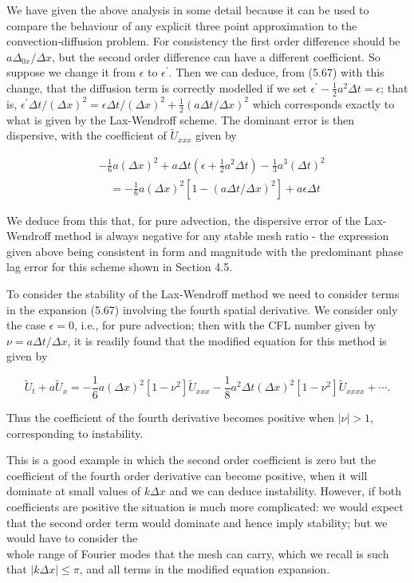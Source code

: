 \documentclass[10pt]{article}
\begin{document}
We have given the above analysis in some detail because it can be used to compare the behaviour of any explicit three point approximation to the convection-diffusion problem. For consistency the first order difference should be \(a \Delta_{0 x} / \Delta x\), but the second order difference can have a different coefficient. So suppose we change it from \(\epsilon\) to \(\epsilon^{\prime}\). Then we can deduce, from (5.67) with this change, that the diffusion term is correctly modelled if we set \(\epsilon^{\prime}-\frac{1}{2} a^{2} \Delta t=\epsilon\); that is, \(\epsilon^{\prime} \Delta t /(\Delta x)^{2}=\epsilon \Delta t /(\Delta x)^{2}+\frac{1}{2}(a \Delta t / \Delta x)^{2}\) which corresponds exactly to what is given by the Lax-Wendroff scheme. The dominant error is then dispersive, with the coefficient of \(\tilde{U}_{x x x}\) given by

\[
\begin{aligned}
& -\frac{1}{6} a(\Delta x)^{2}+a \Delta t\left(\epsilon+\frac{1}{2} a^{2} \Delta t\right)-\frac{1}{3} a^{3}(\Delta t)^{2} \\
& \quad=-\frac{1}{6} a(\Delta x)^{2}\left[1-(a \Delta t / \Delta x)^{2}\right]+a \epsilon \Delta t
\end{aligned}
\]

We deduce from this that, for pure advection, the dispersive error of the Lax-Wendroff method is always negative for any stable mesh ratio - the expression given above being consistent in form and magnitude with the predominant phase lag error for this scheme shown in Section 4.5.

To consider the stability of the Lax-Wendroff method we need to consider terms in the expansion (5.67) involving the fourth spatial derivative. We consider only the case \(\epsilon=0\), i.e., for pure advection; then with the CFL number given by \(\nu=a \Delta t / \Delta x\), it is readily found that the modified equation for this method is given by

\[
\tilde{U}_{t}+a \tilde{U}_{x}=-\frac{1}{6} a(\Delta x)^{2}\left[1-\nu^{2}\right] \tilde{U}_{x x x}-\frac{1}{8} a^{2} \Delta t(\Delta x)^{2}\left[1-\nu^{2}\right] \tilde{U}_{x x x x}+\cdots .
\]

Thus the coefficient of the fourth derivative becomes positive when \(|\nu|>1\), corresponding to instability.

This is a good example in which the second order coefficient is zero but the coefficient of the fourth order derivative can become positive, when it will dominate at small values of \(k \Delta x\) and we can deduce instability. However, if both coefficients are positive the situation is much more complicated: we would expect that the second order term would dominate and hence imply stability; but we would have to consider the\\
whole range of Fourier modes that the mesh can carry, which we recall is such that \(|k \Delta x| \leq \pi\), and all terms in the modified equation expansion.
\end{document}
